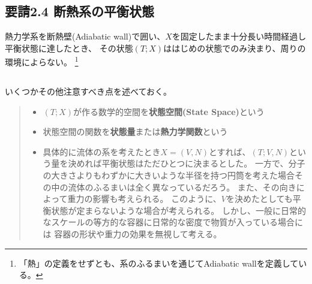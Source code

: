 \subsection*{要請2.4 断熱系の平衡状態}
熱力学系を断熱壁(Adiabatic wall)で囲い、$X$を固定したまま十分長い時間経過し平衡状態に達したとき、
その状態$(T; X)$ははじめの状態でのみ決まり、周りの環境によらない。
\footnote{
  「熱」の定義をせずとも、系のふるまいを通じてAdiabatic wallを定義している。
}

\subsection*{}
いくつかその他注意すべき点を述べておく。
\begin{quote}
  \begin{itemize}
    \item $(T;X)$が作る数学的空間を\textbf{状態空間(State Space)}という
    \item 状態空間の関数を\textbf{状態量}または\textbf{熱力学関数}という
    \item 
      具体的に流体の系を考えたとき$X=(V, N)$とすれば、$(T;V, N)$という量を決めれば平衡状態はただひとつに決まるとした。
      一方で、分子の大きさよりもわずかに大きいような半径を持つ円筒を考えた場合その中の流体のふるまいは全く異なっているだろう。
      また、その向きによって重力の影響も考えられる。
      このように、$V$を決めたとしても平衡状態が定まらないような場合が考えられる。
      しかし、一般に日常的なスケールの等方的な容器に日常的な密度で物質が入っている場合には
      容器の形状や重力の効果を無視して考える。
      
  \end{itemize}
\end{quote}
